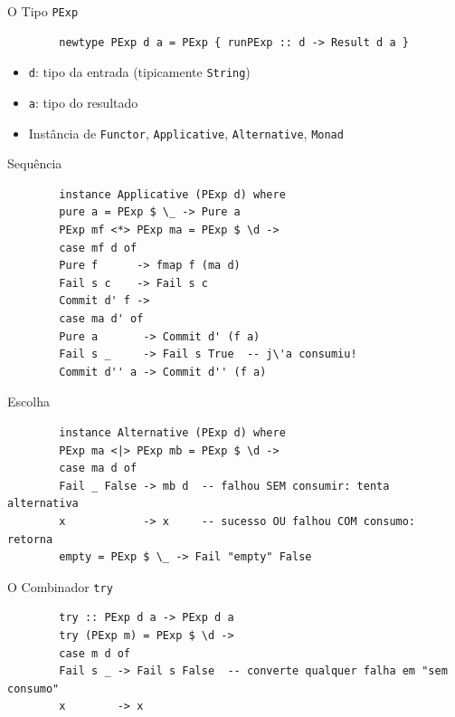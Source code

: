 \begin{frame}[fragile]{O Tipo \texttt{PExp}}

    \begin{lstlisting}
        newtype PExp d a = PExp { runPExp :: d -> Result d a }
    \end{lstlisting}

    \begin{itemize}

        \item
        \texttt{d}: tipo da entrada (tipicamente
        \texttt{String})
        \item
        \texttt{a}: tipo do resultado
        \item
        Instância de \texttt{Functor},
        \texttt{Applicative},
        \texttt{Alternative}, \texttt{Monad}
    \end{itemize}
\end{frame}

\begin{frame}[fragile]{Sequência}

    \begin{lstlisting}
        instance Applicative (PExp d) where
        pure a = PExp $ \_ -> Pure a
        PExp mf <*> PExp ma = PExp $ \d ->
        case mf d of
        Pure f      -> fmap f (ma d)
        Fail s c    -> Fail s c
        Commit d' f ->
        case ma d' of
        Pure a       -> Commit d' (f a)
        Fail s _     -> Fail s True  -- j\'a consumiu!
        Commit d'' a -> Commit d'' (f a)
    \end{lstlisting}
\end{frame}

\begin{frame}[fragile]{Escolha}

    \begin{lstlisting}
        instance Alternative (PExp d) where
        PExp ma <|> PExp mb = PExp $ \d ->
        case ma d of
        Fail _ False -> mb d  -- falhou SEM consumir: tenta alternativa
        x            -> x     -- sucesso OU falhou COM consumo: retorna
        empty = PExp $ \_ -> Fail "empty" False
    \end{lstlisting}
\end{frame}

\begin{frame}[fragile]{O Combinador \texttt{try}}

    \begin{lstlisting}
        try :: PExp d a -> PExp d a
        try (PExp m) = PExp $ \d ->
        case m d of
        Fail s _ -> Fail s False  -- converte qualquer falha em "sem consumo"
        x        -> x
    \end{lstlisting}
\end{frame}


